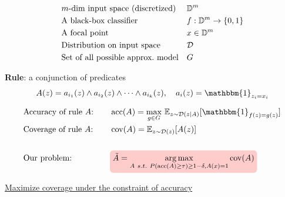 \documentclass[aspectratio=169]{slide-en}
\begin{document}
\begin{frame}{}
  \vspace{-1.4em}
  \begin{align*}
     & \text{$m$-dim input space (discretized)}  &  & \mathbb{D}^{m}             \\
     & \text{A black-box classifier}             &  & f:\mathbb{D}^{m}\to\{0,1\} \\
     & \text{A focal point}                      &  & x\in\mathbb{D}^{m}         \\
     & \text{Distribution on input space}        &  & \mathcal{D}         \\
     & \text{Set of all possible approx.\ model} &  & G
  \end{align*}

  \textbf{Rule}: a conjunction of predicates
  \vspace{-0.5em}
  \begin{equation*}
    A(z)=a_{i_1}(z)\wedge a_{i_2}(z)\wedge\dots\wedge a_{i_k}(z),\quad
    a_i(z)=\mathbbm{1}_{z_i=x_i}
  \end{equation*}
\end{frame}

{%
\vfuzz=13.08765pt
\begin{frame}{}
  \bigskip
  \bigskip
  \bigskip

  \begin{alignat*}{2}
     & \text{Accuracy of rule $A$:} & \quad & \Prec(A)=\underset{g\in G}{\max}
    \ \mathbb{E}_{z\sim\mathcal{D}(z|A)}[\mathbbm{1}_{f(z)=g(z)}]
    \COLabel{prec}{}
    \\
     & \text{Coverage of rule $A$:} & \quad & \operatorname{cov}(A)=
    \mathbb{E}_{z\sim\mathcal{D}(z)}[A(z)]
    \COLabel{cov}{}
    \\
    \\
     & \text{Our problem:}          & \quad & \colorrect{red!20}{$
        \tilde{A}=\underset{A\ s.t.
          \ P(\Prec(A)\ge\tau)\ge1-\delta,A(x)=1}  %
        {\arg\max}\operatorname{cov}(A)  %
      $}
    \COLabel{problem}{}
    \\
  \end{alignat*}

  \begin{center}
    \underline{Maximize coverage under the constraint of accuracy}
  \end{center}
\end{frame}
}
\end{document}
